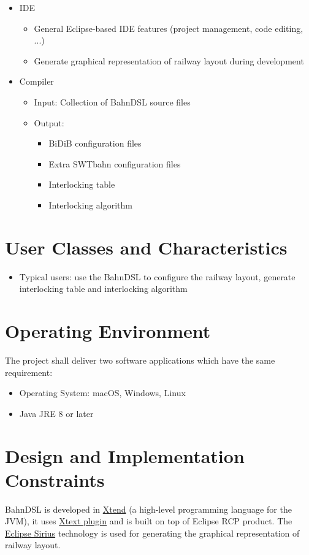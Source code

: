 \documentclass[a4paper,11pt]{scrreprt}
\begin{document}
\begin{itemize}
    \item IDE
    \begin{itemize}
        \item General Eclipse-based IDE features (project management, code editing, ...)
        \item Generate graphical representation of railway layout during development
    \end{itemize}
    \item Compiler
    \begin{itemize}
        \item Input: Collection of BahnDSL source files
        \item Output:
        \begin{itemize}
            \item BiDiB configuration files
            \item Extra SWTbahn configuration files
            \item Interlocking table
            \item Interlocking algorithm
        \end{itemize}
    \end{itemize}
\end{itemize}

\section{User Classes and Characteristics}
\begin{itemize}
    \item Typical users: use the BahnDSL to configure the railway layout, generate interlocking table and interlocking algorithm
\end{itemize}

\section{Operating Environment}

The project shall deliver two software applications which have the same requirement:
\begin{itemize}
    \item Operating System: macOS, Windows, Linux
    \item Java JRE 8 or later
\end{itemize}

\section{Design and Implementation Constraints}
BahnDSL is developed in \href{https://www.eclipse.org/xtend/}{Xtend} (a high-level programming language for the JVM), it uses \href{https://www.eclipse.org/Xtext/}{Xtext plugin} and is built on top of Eclipse RCP product. The \href{https://www.eclipse.org/sirius/}{Eclipse Sirius} technology is used for generating the graphical representation of railway layout.
\end{document}
